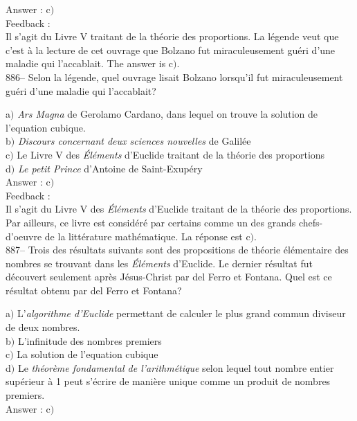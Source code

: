 ﻿\documentclass[letterpaper, 12pt]{article}
\begin{document}
Answer : c$)$\\

Feedback :\\
Il s'agit du Livre V traitant de la th\'eorie des proportions.
La l\'egende veut que c'est \`a la lecture de cet ouvrage que Bolzano fut
miraculeusement gu\'eri d'une maladie qui l'accablait. The answer is
c$)$.\\

886-- Selon la l\'egende, quel ouvrage lisait Bolzano lorsqu'il fut
miraculeusement gu\'eri d'une maladie qui l'accablait?

a$)$ {\sl Ars Magna} de Gerolamo Cardano, dans lequel on trouve la solution
de l'equation cubique. \\
b$)$ {\sl Discours concernant deux sciences nouvelles} de Galil\'ee  \\
c$)$ Le Livre V des {\sl \'El\'ements} d'Euclide traitant de la th\'eorie
des proportions \\
d$)$ {\sl Le petit Prince} d'Antoine de Saint-Exup\'ery  \\

Answer : c$)$\\

Feedback :\\
Il s'agit du Livre V des {\sl \'El\'ements} d'Euclide traitant de la
th\'eorie des proportions.
Par ailleurs, ce livre est consid\'er\'e par certains comme un
des grands chefs-d'oeuvre de la litt\'erature math\'ematique. La r\'eponse
est c$)$.\\

887-- Trois des r\'esultats suivants sont des propositions de
th\'eorie \'el\'ementaire des nombres se trouvant dans les {\sl
\'El\'ements} d'Euclide. Le dernier r\'esultat fut d\'ecouvert
seulement apr\`es J\'esus-Christ par del Ferro et Fontana. Quel est
ce r\'esultat obtenu par del Ferro et Fontana?

a$)$ L'{\sl algorithme d'Euclide} permettant de calculer le plus grand
commun diviseur de deux nombres. \\
b$)$ L'infinitude des nombres premiers  \\
c$)$ La solution de l'equation cubique \\
d$)$ Le {\sl th\'eor\`eme fondamental de l'arithm\'etique} selon lequel tout
nombre entier sup\'erieur \`a 1 peut
s'\'ecrire de mani\`ere unique comme un produit de nombres premiers.\\

Answer : c$)$\\
\end{document}
